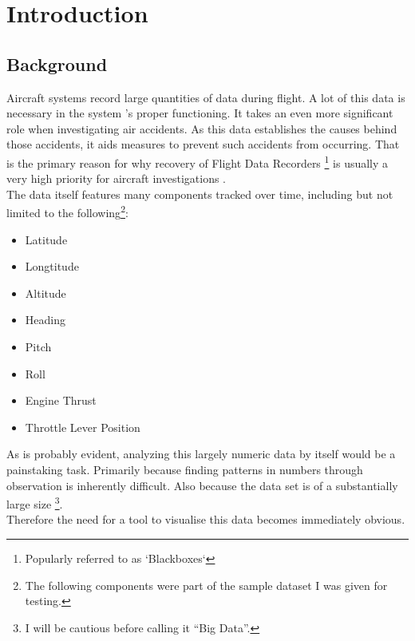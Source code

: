 
\chapter{Introduction} %

\label{ch:introduction} %

\section{Background}

Aircraft systems record large quantities of data during flight. A lot of this data is necessary in the system 's proper functioning. It takes an even more significant role when investigating air accidents.
As this data establishes the causes behind those accidents, it aids measures to prevent such accidents from occurring. That is the primary reason for why recovery of Flight Data Recorders \footnote{Popularly referred to as `Blackboxes`} is usually a very high priority for aircraft investigations \citep{faa:fdr}.\\

The data itself features many components tracked over time, including but not limited to the following\footnote{The following components were part of the sample dataset I was given for testing.}:
\begin{itemize}
\item Latitude
\item Longtitude
\item Altitude
\item Heading
\item Pitch
\item Roll
\item Engine Thrust
\item Throttle Lever Position
\end{itemize}

As is probably evident, analyzing this largely numeric data by itself would be a painstaking task. Primarily because finding patterns in numbers through observation is inherently difficult. Also because the data set is of a substantially large size \footnote{I will be cautious before calling it ``Big Data''. }. \\

Therefore the need for a tool to visualise this data becomes immediately obvious. \\

